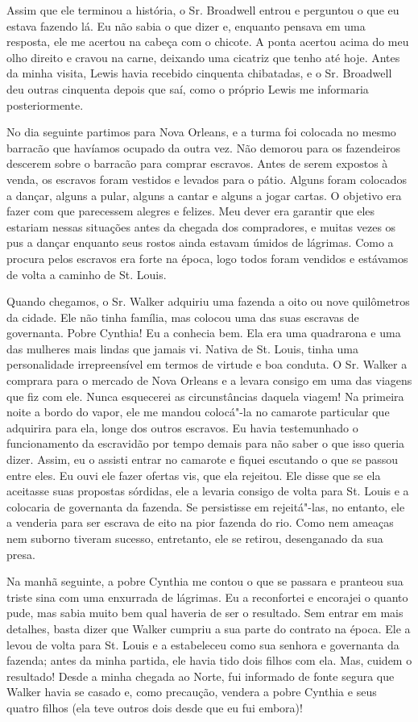 Assim que ele terminou a história, o Sr. Broadwell entrou e perguntou o
que eu estava fazendo lá. Eu não sabia o que dizer e, enquanto pensava
em uma resposta, ele me acertou na cabeça com o chicote. A ponta acertou
acima do meu olho direito e cravou na carne, deixando uma cicatriz que
tenho até hoje. Antes da minha visita, Lewis havia recebido cinquenta
chibatadas, e o Sr. Broadwell deu outras cinquenta depois que saí, como
o próprio Lewis me informaria posteriormente.

No dia seguinte partimos para Nova Orleans, e a turma foi colocada no
mesmo barracão que havíamos ocupado da outra vez. Não demorou para os
fazendeiros descerem sobre o barracão para comprar escravos. Antes de
serem expostos à venda, os escravos foram vestidos e levados para o
pátio. Alguns foram colocados a dançar, alguns a pular, alguns a cantar
e alguns a jogar cartas. O objetivo era fazer com que parecessem alegres
e felizes. Meu dever era garantir que eles estariam nessas situações
antes da chegada dos compradores, e muitas vezes os pus a dançar
enquanto seus rostos ainda estavam úmidos de lágrimas. Como a procura
pelos escravos era forte na época, logo todos foram vendidos e estávamos
de volta a caminho de St. Louis.

Quando chegamos, o Sr. Walker adquiriu uma fazenda a oito ou nove
quilômetros da cidade. Ele não tinha família, mas colocou uma das suas
escravas de governanta. Pobre Cynthia! Eu a conhecia bem. Ela era uma
quadrarona e uma das mulheres mais lindas que jamais vi. Nativa de St.
Louis, tinha uma personalidade irrepreensível em termos de virtude e boa
conduta. O Sr. Walker a comprara para o mercado de Nova Orleans e a
levara consigo em uma das viagens que fiz com ele. Nunca esquecerei as
circunstâncias daquela viagem! Na primeira noite a bordo do vapor, ele
me mandou colocá"-la no camarote particular que adquirira para ela, longe
dos outros escravos. Eu havia testemunhado o funcionamento da escravidão
por tempo demais para não saber o que isso queria dizer. Assim, eu o
assisti entrar no camarote e fiquei escutando o que se passou entre
eles. Eu ouvi ele fazer ofertas vis, que ela rejeitou. Ele disse que se
ela aceitasse suas propostas sórdidas, ele a levaria consigo de volta
para St. Louis e a colocaria de governanta da fazenda. Se persistisse em
rejeitá"-las, no entanto, ele a venderia para ser escrava de eito na pior
fazenda do rio. Como nem ameaças nem suborno tiveram sucesso,
entretanto, ele se retirou, desenganado da sua presa.

Na manhã seguinte, a pobre Cynthia me contou o que se passara e pranteou
sua triste sina com uma enxurrada de lágrimas. Eu a reconfortei e
encorajei o quanto pude, mas sabia muito bem qual haveria de ser o
resultado. Sem entrar em mais detalhes, basta dizer que Walker cumpriu a
sua parte do contrato na época. Ele a levou de volta para St. Louis e a
estabeleceu como sua senhora e governanta da fazenda; antes da minha
partida, ele havia tido dois filhos com ela. Mas, cuidem o resultado!
Desde a minha chegada ao Norte, fui informado de fonte segura que Walker
havia se casado e, como precaução, vendera a pobre Cynthia e seus quatro
filhos (ela teve outros dois desde que eu fui embora)!

